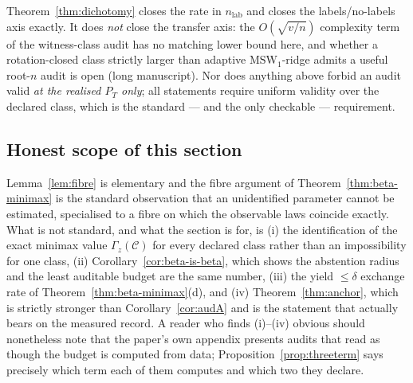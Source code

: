 \begin{remark}\label{rem:notsharp}
Theorem~\ref{thm:dichotomy} closes the rate in $n_{\mathrm{lab}}$ and closes the
labels/no-labels axis exactly. It does \emph{not} close the transfer axis: the
$O(\sqrt{v/n})$ complexity term of the witness-class audit has no matching lower bound here,
and whether a rotation-closed class strictly larger than adaptive $\mathrm{MSW}_1$-ridge
admits a useful root-$n$ audit is open (long manuscript). Nor does anything above forbid an
audit valid \emph{at the realised $P_T$ only}; all statements require uniform validity over
the declared class, which is the standard --- and the only checkable --- requirement.
\end{remark}

\subsection{Honest scope of this section}

\begin{remark}\label{rem:honest-scope}
Lemma~\ref{lem:fibre} is elementary and the fibre argument of
Theorem~\ref{thm:beta-minimax} is the standard observation that an unidentified parameter
cannot be estimated, specialised to a fibre on which the observable laws coincide exactly.
What is not standard, and what the section is for, is (i) the identification of the exact
minimax value $\Gamma_z(\mathcal C)$ for every declared class rather than an impossibility
for one class, (ii) Corollary~\ref{cor:beta-is-beta}, which shows the abstention radius and
the least auditable budget are the same number, (iii) the yield $\le\delta$ exchange rate of
Theorem~\ref{thm:beta-minimax}(d), and (iv) Theorem~\ref{thm:anchor}, which is strictly
stronger than Corollary~\ref{cor:audA} and is the statement that actually bears on the
measured record. A reader who finds (i)--(iv) obvious should nonetheless note that the
paper's own appendix presents audits that read as though the budget is computed from data;
Proposition~\ref{prop:threeterm} says precisely which term each of them computes and which
two they declare.
\end{remark}
